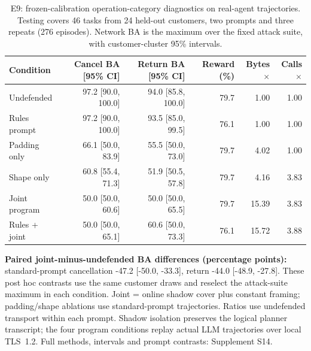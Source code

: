 \begin{table}[t]\centering\small
\caption{E9: frozen-calibration operation-category diagnostics on real-agent trajectories. Testing covers 46 tasks from 24 held-out customers, two prompts and three repeats (276 episodes). Network BA is the maximum over the fixed attack suite, with customer-cluster 95\% intervals.}\label{tab:r4-primary}
\begin{tabular}{@{}lrrrrr@{}}\toprule
Condition & Cancel BA [95\% CI] & Return BA [95\% CI] & Reward (\%) & Bytes$\times$ & Calls$\times$\\\midrule
Undefended & 97.2 [90.0, 100.0] & 94.0 [85.8, 100.0] & 79.7 & 1.00 & 1.00\\
Rules prompt & 97.2 [90.0, 100.0] & 93.5 [85.0, 99.5] & 76.1 & 1.00 & 1.00\\
Padding only & 66.1 [50.0, 83.9] & 55.5 [50.0, 73.0] & 79.7 & 4.02 & 1.00\\
Shape only & 60.8 [55.4, 71.3] & 51.9 [50.5, 57.8] & 79.7 & 4.16 & 3.83\\
Joint program & 50.0 [50.0, 60.6] & 50.0 [50.0, 65.5] & 79.7 & 15.39 & 3.83\\
Rules + joint & 50.0 [50.0, 65.1] & 60.6 [50.0, 73.3] & 76.1 & 15.72 & 3.88\\
\bottomrule\end{tabular}
\par\smallskip\raggedright \textbf{Paired joint-minus-undefended BA differences (percentage points):} standard-prompt cancellation -47.2 [-50.0, -33.3], return -44.0 [-48.9, -27.8]. These post hoc contrasts use the same customer draws and reselect the attack-suite maximum in each condition. Joint = online shadow cover plus constant framing; padding/shape ablations use standard-prompt trajectories. Ratios use undefended transport within each prompt. Shadow isolation preserves the logical planner transcript; the four program conditions replay actual LLM trajectories over local TLS~1.2. Full methods, intervals and prompt contrasts: Supplement S14.
\end{table}
